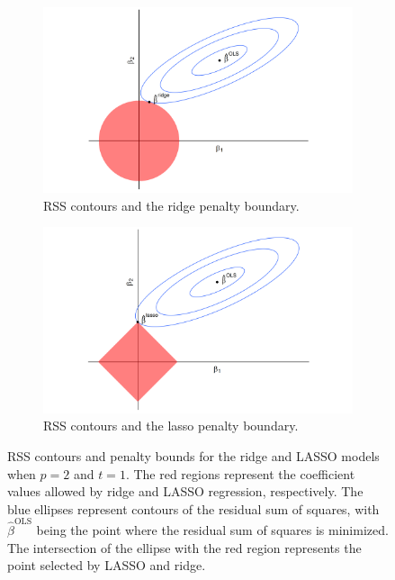\documentclass{article}
\begin{document}
\begin{figure}[!h]
	\centering
	\begin{subfigure}[b]{0.45\textwidth}
		\caption{RSS contours and the ridge penalty boundary.}
		\label{fig:ridge-diagram}
		\includegraphics[width=\textwidth]{images/ridge-diagram.png}
	\end{subfigure}
	\hspace{30pt}
	\begin{subfigure}[b]{0.45\textwidth}
		\caption{RSS contours and the lasso penalty boundary.}
		\label{fig:lasso-diagram}
		\includegraphics[width=\textwidth]{images/lasso-diagram.png}
	\end{subfigure}
	\captionsetup{width = 5in}
	\caption{RSS contours and penalty bounds for the ridge and LASSO models when $p=2$ and $t = 1$. The red regions represent the coefficient values allowed by ridge and LASSO regression, respectively. The blue ellipses represent contours of the residual sum of squares, with $\hat{\beta}^{\text{OLS}}$ being the point where the residual sum of squares is minimized. The intersection of the ellipse with the red region represents the point selected by LASSO and ridge.}
	\label{fig:ridge-lasso-diagram}
\end{figure}
\end{document}
